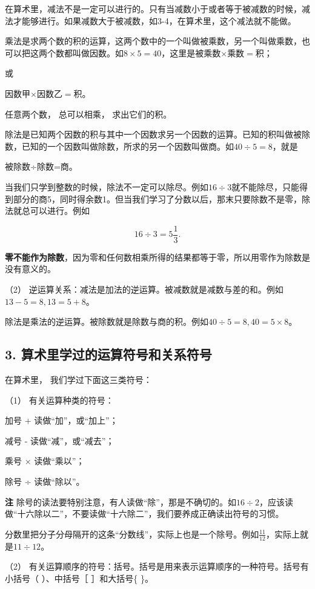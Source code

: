 在算术里，减法不是一定可以进行的。只有当减数小于或者等于被减数的时候，减法才能够进行。如果减数大于被减数，如3-4，在算术里，这个减法就不能做。

乘法是求两个数的积的运算，这两个数中的一个叫做被乘数，另一个叫做乘数，也可以把这两个数都叫做因数。如\(8 \times 5 = 40\)，这里是被乘数\(\times\)乘数\(=\)积；

或

因数甲\(\times\)因数乙\(=\)积。

任意两个数， 总可以相乘， 求出它们的积。

除法是已知两个因数的积与其中一个因数求另一个因数的运算。已知的积叫做被除数，已知的一个因数叫做除数，所求的另一个因数叫做商。如\(40 \div 5 = 8\)，就是

被除数÷除数=商。

当我们只学到整数的时候，除法不一定可以除尽。例如\(16 \div 3\)就不能除尽，只能得到部分的商5，同时得余数1。但当我们学习了分数以后，那末只要除数不是零，除法就总可以进行。例如

\[
16 \div 3 = 5 \frac{1}{3}.
\]

\textbf{零不能作为除数}，因为零和任何数相乘所得的结果都等于零，所以用零作为除数是没有意义的。

（2）
逆运算关系：减法是加法的逆运算。被减数就是减数与差的和。例如\(13 - 5 = 8, 13 = 5 + 8\)。

除法是乘法的逆运算。被除数就是除数与商的积。例如\(40 \div 5 = 8, 40 = 5 \times 8\)。

\subsection{3. 算术里学过的运算符号和关系符号}

在算术里， 我们学过下面这三类符号：

（1） 有关运算种类的符号：

加号 + 读做``加''，或``加上''；

减号 - 读做``减''，或``减去''；

乘号 × 读做``乘以''；

除号 ÷ 读做``除以''。

\textbf{注}
除号的读法要特别注意，有人读做``除''，那是不确切的。如\(16 \div 2\)，应该读做``十六除以二''，不要读做``十六除二''，我们要养成正确读出符号的习惯。

分数里把分子分母隔开的这条``分数线''，实际上也是一个除号。例如\(\frac{11}{12}\)，实际上就是\(11 \div 12\)。

（2） 有关运算顺序的符号：括号。括号是用来表示运算顺序的一种符号。括号有小括号（ ）、中括号［ ］和大括号\{ \}。

